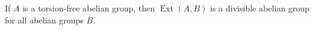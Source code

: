 If $A$ is a torsion-free abelian group, then $\operatorname{Ext}(A, B)$ is a divisible abelian group for all abelian groups $B$.
